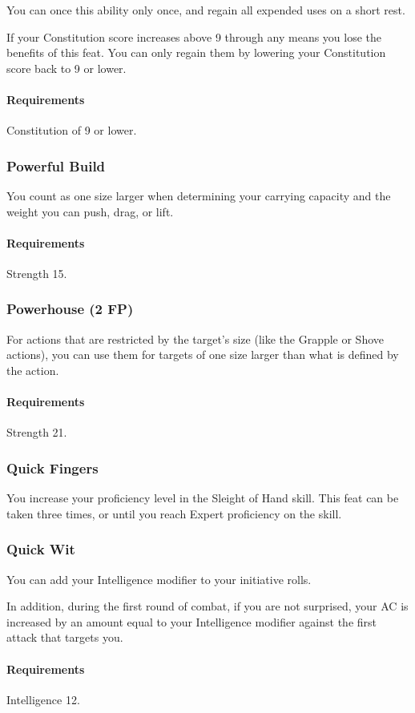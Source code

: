     You can once this ability only once, and regain all expended uses on a short rest.

    If your Constitution score increases above 9 through any means you lose the benefits of this feat.
    You can only regain them by lowering your Constitution score back to 9 or lower.
    \paragraph{Requirements} Constitution of 9 or lower.
\subsubsection{Powerful Build} \label{feat::powerfulbuild_skill}
    You count as one size larger when determining your carrying capacity and the weight you can push, drag, or lift.
    \paragraph{Requirements} Strength 15.
\subsubsection{Powerhouse (2 FP)} \label{feat::powerhouse}
    For actions that are restricted by the target's size (like the Grapple or Shove actions), you can use them for targets of one size larger than what is defined by the action.
    \paragraph{Requirements} Strength 21.
\subsubsection{Quick Fingers} \label{feat::quickfingers}
    You increase your proficiency level in the Sleight of Hand skill.
    This feat can be taken three times, or until you reach Expert proficiency on the skill.
\subsubsection{Quick Wit} \label{feat::quickwit}
    You can add your Intelligence modifier to your initiative rolls.

    In addition, during the first round of combat, if you are not surprised, your AC is increased by an amount equal to your Intelligence modifier against the first attack that targets you.
    \paragraph{Requirements} Intelligence 12.
